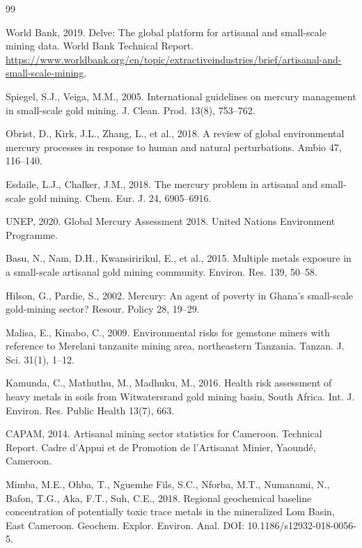 \documentclass[preprint,12pt,number]{elsarticle}
\begin{document}
\begin{thebibliography}{99}

World Bank, 2019. Delve: The global platform for artisanal and small-scale mining data. World Bank Technical Report. \url{https://www.worldbank.org/en/topic/extractiveindustries/brief/artisanal-and-small-scale-mining}.

Spiegel, S.J., Veiga, M.M., 2005. International guidelines on mercury management in small-scale gold mining. J. Clean. Prod. 13(8), 753--762.

Obrist, D., Kirk, J.L., Zhang, L., et al., 2018. A review of global environmental mercury processes in response to human and natural perturbations. Ambio 47, 116--140.

Esdaile, L.J., Chalker, J.M., 2018. The mercury problem in artisanal and small-scale gold mining. Chem. Eur. J. 24, 6905--6916.

UNEP, 2020. Global Mercury Assessment 2018. United Nations Environment Programme.

Basu, N., Nam, D.H., Kwansiririkul, E., et al., 2015. Multiple metals exposure in a small-scale artisanal gold mining community. Environ. Res. 139, 50--58.

Hilson, G., Pardie, S., 2002. Mercury: An agent of poverty in Ghana's small-scale gold-mining sector? Resour. Policy 28, 19--29.

Malisa, E., Kinabo, C., 2009. Environmental risks for gemstone miners with reference to Merelani tanzanite mining area, northeastern Tanzania. Tanzan. J. Sci. 31(1), 1--12.

Kamunda, C., Mathuthu, M., Madhuku, M., 2016. Health risk assessment of heavy metals in soils from Witwatersrand gold mining basin, South Africa. Int. J. Environ. Res. Public Health 13(7), 663.

CAPAM, 2014. Artisanal mining sector statistics for Cameroon. Technical Report. Cadre d'Appui et de Promotion de l'Artisanat Minier, Yaound\'{e}, Cameroon.

Mimba, M.E., Ohba, T., Nguemhe Fils, S.C., Nforba, M.T., Numanami, N., Bafon, T.G., Aka, F.T., Suh, C.E., 2018. Regional geochemical baseline concentration of potentially toxic trace metals in the mineralized Lom Basin, East Cameroon. Geochem. Explor. Environ. Anal. DOI: 10.1186/s12932-018-0056-5.


\end{thebibliography}
\end{document}

